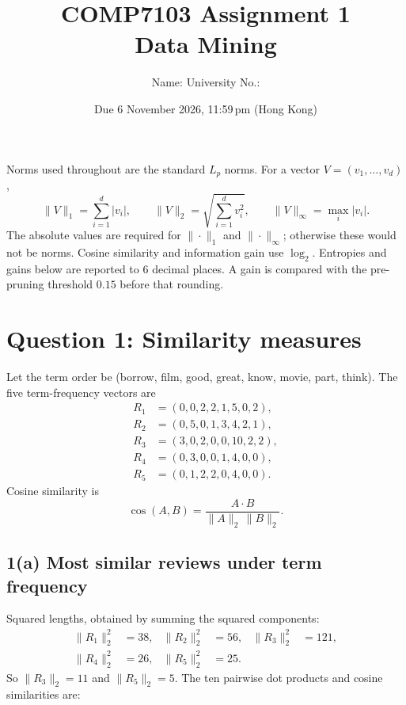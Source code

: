 \documentclass[11pt]{article}
\title{\textbf{COMP7103 Assignment 1}\\[0.4em]
\large Data Mining}
\author{Name: \underline{\hspace{5.5cm}} \quad University No.: \underline{\hspace{4.2cm}}}
\date{Due 6 November 2026, 11:59\,pm (Hong Kong)}
\begin{document}
\maketitle
\thispagestyle{fancy}

\noindent
Norms used throughout are the standard $L_p$ norms. For a vector $V=(v_1,\ldots,v_d)$,
\[
\|V\|_1=\sum_{i=1}^{d}|v_i|,\qquad
\|V\|_2=\sqrt{\sum_{i=1}^{d}v_i^2},\qquad
\|V\|_\infty=\max_i|v_i|.
\]
The absolute values are required for $\|\cdot\|_1$ and $\|\cdot\|_\infty$; otherwise these would not be norms. Cosine similarity and information gain use $\log_2$. Entropies and gains below are reported to 6 decimal places. A gain is compared with the pre-pruning threshold $0.15$ before that rounding.

\tableofcontents
\vspace{0.5em}

\section{Question 1: Similarity measures}

Let the term order be (borrow, film, good, great, know, movie, part, think). The five term-frequency vectors are
\begin{align*}
R_1 &= (0,0,2,2,1,5,0,2),\\
R_2 &= (0,5,0,1,3,4,2,1),\\
R_3 &= (3,0,2,0,0,10,2,2),\\
R_4 &= (0,3,0,0,1,4,0,0),\\
R_5 &= (0,1,2,2,0,4,0,0).
\end{align*}
Cosine similarity is
\[
\cos(A,B)=\frac{A\cdot B}{\|A\|_2\,\|B\|_2}.
\]

\subsection*{1(a) Most similar reviews under term frequency}

Squared lengths, obtained by summing the squared components:
\[
\begin{aligned}
\|R_1\|_2^2&=38, & \|R_2\|_2^2&=56, & \|R_3\|_2^2&=121,\\
\|R_4\|_2^2&=26, & \|R_5\|_2^2&=25.
\end{aligned}
\]
So $\|R_3\|_2=11$ and $\|R_5\|_2=5$. The ten pairwise dot products and cosine similarities are:
\end{document}

